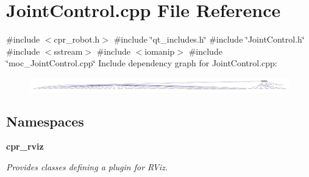 \section{Joint\+Control.\+cpp File Reference}
\label{JointControl_8cpp}
{\ttfamily \#include $<$cpr\+\_\+robot.\+h$>$}\newline
{\ttfamily \#include \char`\"{}qt\+\_\+includes.\+h\char`\"{}}\newline
{\ttfamily \#include \char`\"{}Joint\+Control.\+h\char`\"{}}\newline
{\ttfamily \#include $<$sstream$>$}\newline
{\ttfamily \#include $<$iomanip$>$}\newline
{\ttfamily \#include \char`\"{}moc\+\_\+\+Joint\+Control.\+cpp\char`\"{}}\newline
Include dependency graph for Joint\+Control.\+cpp\+:
\nopagebreak
\begin{figure}[H]
\begin{center}
\leavevmode
\includegraphics[width=350pt]{JointControl_8cpp__incl}
\end{center}
\end{figure}
\subsection*{Namespaces}
\begin{DoxyCompactItemize}
\item 
 \textbf{ cpr\+\_\+rviz}
\begin{DoxyCompactList}\small\item\em Provides classes defining a plugin for R\+Viz. \end{DoxyCompactList}\end{DoxyCompactItemize}
